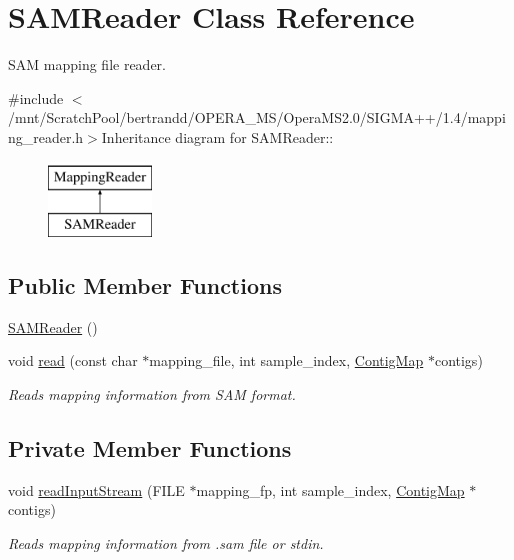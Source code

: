 \hypertarget{classSAMReader}{
\section{SAMReader Class Reference}
\label{classSAMReader}
}


SAM mapping file reader.  


{\ttfamily \#include $<$/mnt/ScratchPool/bertrandd/OPERA\_\-MS/OperaMS2.0/SIGMA++/1.4/mapping\_\-reader.h$>$}Inheritance diagram for SAMReader::\begin{figure}[H]
\begin{center}
\leavevmode
\includegraphics[height=2cm]{classSAMReader}
\end{center}
\end{figure}
\subsection*{Public Member Functions}
\begin{DoxyCompactItemize}
\item 
\hyperlink{classSAMReader_a02e0ad94153bdfb9beb2dc809b4a6741}{SAMReader} ()
\item 
void \hyperlink{classSAMReader_a6c11ffaf56aa72aae2d5999cbd21de6f}{read} (const char $\ast$mapping\_\-file, int sample\_\-index, \hyperlink{contig_8h_aa2acb8d3b78def617ec4509a1f684c4e}{ContigMap} $\ast$contigs)
\begin{DoxyCompactList}\small\item\em Reads mapping information from SAM format. \item\end{DoxyCompactList}\end{DoxyCompactItemize}
\subsection*{Private Member Functions}
\begin{DoxyCompactItemize}
\item 
void \hyperlink{classSAMReader_a5871df65884559cc9add85881617e9c3}{readInputStream} (FILE $\ast$mapping\_\-fp, int sample\_\-index, \hyperlink{contig_8h_aa2acb8d3b78def617ec4509a1f684c4e}{ContigMap} $\ast$contigs)
\begin{DoxyCompactList}\small\item\em Reads mapping information from .sam file or stdin. \item\end{DoxyCompactList}\end{DoxyCompactItemize}


